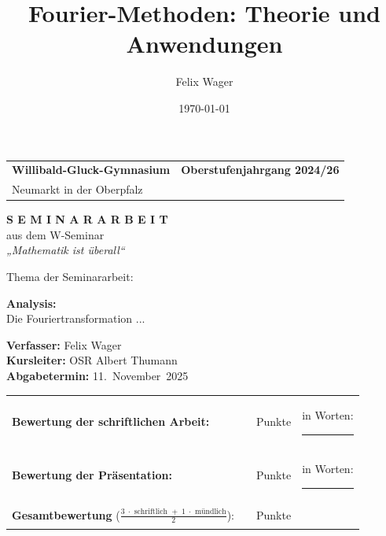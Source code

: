 \documentclass[a4paper,12pt]{article}
\title{Fourier-Methoden: Theorie und Anwendungen}
\author{Felix Wager}
\date{\today}
\theoremstyle{definition}
\theoremstyle{remark}
\begin{document}
\thispagestyle{empty}
\begin{center}

\vspace*{1cm}

\begin{tabular}{p{7cm}p{7cm}}
\textbf{Willibald-Gluck-Gymnasium} & \hfill \textbf{Oberstufenjahrgang 2024/26} \\
Neumarkt in der Oberpfalz & \\
\end{tabular}

\vspace{3cm}

\textbf{\Large S E M I N A R A R B E I T}\\[0.3cm]
aus dem W-Seminar\\[0.3cm]
\textit{„Mathematik ist überall“}

\vspace{2cm}
\begin{flushleft}
Thema der Seminararbeit:
\end{flushleft}
\begin{center}
\textbf{Analysis:}\\
Die Fouriertransformation ...
\end{center}

\vspace{2cm}

\begin{flushleft}
\textbf{Verfasser:} \hspace{2cm} Felix Wager\\[0.3cm]
\textbf{Kursleiter:} \hspace{2.5cm} OSR Albert Thumann\\[0.3cm]
\textbf{Abgabetermin:} \hspace{1.6cm} 11.\ November\ 2025
\end{flushleft}

\vspace{2cm}

\begin{flushleft}
\begin{tabular}{@{}l l l l@{}}
\textbf{Bewertung der schriftlichen Arbeit:} & \rule{1cm}{0.4pt} & Punkte & in Worten: \rule{3cm}{0.4pt} \\[0.4cm]
\textbf{Bewertung der Präsentation:} & \rule{1cm}{0.4pt} & Punkte & in Worten: \rule{3cm}{0.4pt} \\[0.4cm]
\textbf{Gesamtbewertung} ($\frac{3 \; \cdot \text{ schriftlich } + \; 1 \; \cdot \text{ mündlich}}{2}$): & \rule{1cm}{0.4pt} & Punkte & \\
\end{tabular}


\end{flushleft}
\end{center}
\end{document}
